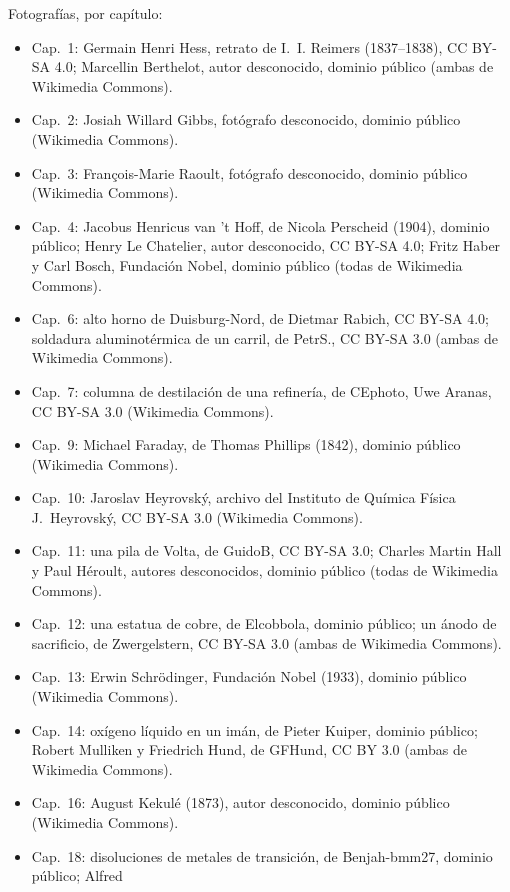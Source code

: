 \bigskip
\noindent Fotografías, por capítulo:
\begin{itemize}\small
  \item Cap.~1: Germain Henri Hess, retrato de I.~I. Reimers (1837--1838),
        CC BY-SA 4.0; Marcellin Berthelot, autor desconocido, dominio público
        (ambas de Wikimedia Commons).
  \item Cap.~2: Josiah Willard Gibbs, fotógrafo desconocido, dominio público
        (Wikimedia Commons).
  \item Cap.~3: François-Marie Raoult, fotógrafo desconocido, dominio público
        (Wikimedia Commons).
  \item Cap.~4: Jacobus Henricus van 't Hoff, de Nicola Perscheid (1904),
        dominio público; Henry Le Chatelier, autor desconocido, CC BY-SA 4.0;
        Fritz Haber y Carl Bosch, Fundación Nobel, dominio público (todas de
        Wikimedia Commons).
  \item Cap.~6: alto horno de Duisburg-Nord, de Dietmar Rabich, CC BY-SA
        4.0; soldadura aluminotérmica de un carril, de PetrS., CC BY-SA 3.0
        (ambas de Wikimedia Commons).
  \item Cap.~7: columna de destilación de una refinería, de CEphoto, Uwe Aranas,
        CC BY-SA 3.0 (Wikimedia Commons).
  \item Cap.~9: Michael Faraday, de Thomas Phillips (1842), dominio público
        (Wikimedia Commons).
  \item Cap.~10: Jaroslav Heyrovsk\'y, archivo del Instituto de Química Física
        J.~Heyrovsk\'y, CC BY-SA 3.0 (Wikimedia Commons).
  \item Cap.~11: una pila de Volta, de GuidoB, CC BY-SA 3.0; Charles Martin Hall
        y Paul H\'eroult, autores desconocidos, dominio público (todas de Wikimedia
        Commons).
  \item Cap.~12: una estatua de cobre, de Elcobbola, dominio público; un ánodo de
        sacrificio, de Zwergelstern, CC BY-SA 3.0 (ambas de Wikimedia Commons).
  \item Cap.~13: Erwin Schr\"odinger, Fundación Nobel (1933), dominio público
        (Wikimedia Commons).
  \item Cap.~14: oxígeno líquido en un imán, de Pieter Kuiper, dominio público;
        Robert Mulliken y Friedrich Hund, de GFHund, CC BY 3.0 (ambas de Wikimedia
        Commons).
  \item Cap.~16: August Kekul\'e (1873), autor desconocido, dominio público
        (Wikimedia Commons).
  \item Cap.~18: disoluciones de metales de transición, de Benjah-bmm27, dominio público; Alfred

\end{itemize}

